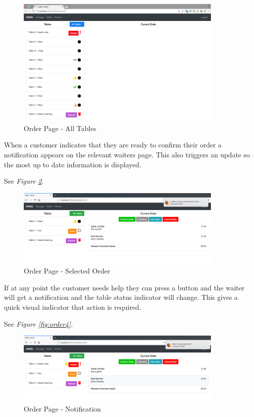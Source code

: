 \documentclass[12pt, twoside, a4paper]{report}
\begin{document}
\begin{figure}[H]
  \centering
  \includegraphics[width=10cm]{orders2.png}
  \caption{Order Page - All Tables}
  \label{fig:orders2}
\end{figure}

When a customer indicates that they are ready to confirm their order a notification appears on the relevant waiters page. This also triggers an update so the most up to date information is displayed.

See \textit{Figure \ref{fig:orders3}}.

\begin{figure}[H]
  \centering
  \includegraphics[width=10cm]{orders3.png}
  \caption{Order Page - Selected Order}
  \label{fig:orders3}
\end{figure}

If at any point the customer needs help they can press a button and the waiter will get a notification and the table status indicator will change. This gives a quick visual indicator that action is required.

See \textit{Figure \ref{fig:order4}}.

\begin{figure}[H]
  \centering
  \includegraphics[width=10cm]{orders4.png}
  \caption{Order Page - Notification}
  \label{fig:orders4}
\end{figure}
\end{document}
